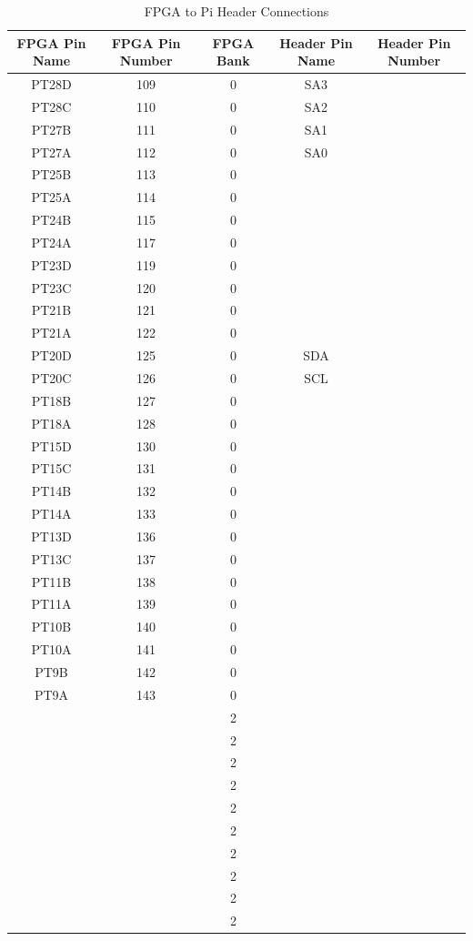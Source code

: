 \documentclass{article}
\begin{document}
\begin{table}[h!]
    \centering
    \begin{tabular}{ c c c c c}
    FPGA Pin Name & FPGA Pin Number & FPGA Bank & Header Pin Name & Header Pin Number \\
    \hline
    PT28D   & 109   & 0    & SA3 &   \\
    PT28C   & 110   & 0    & SA2 &   \\
    PT27B   & 111   & 0    & SA1 &   \\
    PT27A   & 112   & 0    & SA0 &   \\
    PT25B   & 113   & 0    &    &   \\
    PT25A   & 114   & 0    &    &   \\
    PT24B   & 115   & 0    &   &   \\
    PT24A   & 117   & 0    &   &   \\
    PT23D   & 119   & 0    &   &   \\
    PT23C   & 120   & 0    &   &   \\
    PT21B   & 121   & 0    &   &   \\
    PT21A   & 122   & 0    &   &   \\
    PT20D   & 125   & 0    & SDA  &   \\
    PT20C   & 126   & 0    & SCL  &   \\
    PT18B   & 127   & 0    &   &   \\
    PT18A   & 128   & 0    &   &   \\
    PT15D   & 130   & 0    &  &   \\
    PT15C   & 131   & 0    &  &   \\
    PT14B   & 132   & 0    &  &   \\
    PT14A   & 133   & 0    &  &   \\
    PT13D   & 136   & 0    &  &   \\
    PT13C   & 137   & 0    &  &   \\
    PT11B   & 138   & 0    &   &   \\
    PT11A   & 139   & 0    &   &   \\
    PT10B   & 140   & 0    &   &   \\
    PT10A   & 141   & 0    &   &   \\
    PT9B    & 142   & 0    &   &   \\
    PT9A    & 143   & 0    &   &   \\
      &    & 2    &   &   \\
      &    & 2    &   &   \\
      &    & 2    &   &   \\
      &    & 2    &   &   \\
      &    & 2    &  &   \\
      &    & 2    &  &   \\
      &    & 2    &  &   \\
      &    & 2    &  &   \\
      &    & 2    &  &   \\
      &    & 2    &  &   
    \end{tabular}
    \caption{FPGA to Pi Header Connections}
    \label{table:fpga_pi}
\end{table}
\end{document}
